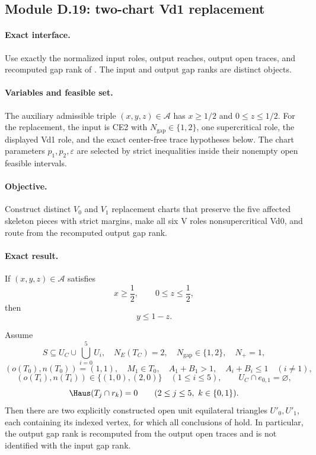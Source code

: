\subsection{Module D.19: two-chart Vd1 replacement}
\label{subsec:app-two-chart-vd1-replacement}

\paragraph{Exact interface.}
Use exactly the normalized input roles, output reaches, output open traces,
and recomputed gap rank of .  The input
and output gap ranks are distinct objects.

\paragraph{Variables and feasible set.}
The auxiliary admissible triple $(x,y,z)\in\mathcal A$ has
$x\ge1/2$ and $0\le z\le1/2$.  For the replacement, the input is CE2 with
$N_{\mathrm{gap}}\in\{1,2\}$, one supercritical role, the displayed Vd1
role, and the exact center-free trace hypotheses below.  The chart parameters
$p_1,p_2,\varepsilon$ are selected by strict inequalities inside their
nonempty open feasible intervals.

\paragraph{Objective.}
Construct distinct $V_0$ and $V_1$ replacement charts that preserve the five
affected skeleton pieces with strict margins, make all six V roles
nonsupercritical Vd0, and route from the recomputed output gap rank.

\paragraph{Exact result.}
\begin{lemma}
\label{lem:app-half-square-admissibility}
If $(x,y,z)\in\mathcal A$ satisfies
\[
 x\ge\frac12,
 \qquad 0\le z\le\frac12,
\]
then
\[
 y\le1-z.
\]
\end{lemma}

\begin{theorem}
\label{thm:app-two-chart-replacement}
Assume
\[
 S\subseteq U_C\cup\bigcup_{i=0}^5U_i,
 \quad N_E(T_C)=2,
 \quad N_{\mathrm{gap}}\in\{1,2\},
 \quad N_+=1,
\]
\[
 (o(T_0),n(T_0))=(1,1),
 \quad M_1\in T_0,
 \quad A_1+B_1>1,
 \quad A_i+B_i\le1\quad(i\ne1),
\]
\[
 (o(T_i),n(T_i))\in\{(1,0),(2,0)\}\quad(1\le i\le5),
 \qquad U_C\cap e_{0,1}=\varnothing,
\]
\[
 \Haus(T_j\cap r_k)=0
 \qquad(2\le j\le5,\ k\in\{0,1\}).
\]
Then there are two explicitly constructed open unit equilateral triangles
$U'_0,U'_1$, each containing its indexed vertex, for which all conclusions
of  hold.  In particular, the output gap
rank is recomputed from the output open traces and is not identified with the
input gap rank.
\end{theorem}

